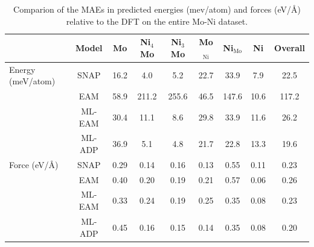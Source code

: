 \documentclass[prb,reprint]{revtex4-2}
\begin{document}
\begin{table}[h]
\centering
\begin{tabular}{lcccccccc}
\hline
                  & Model  & Mo   & Ni$_4$Mo & Ni$_3$Mo & Mo$_{\mathrm{Ni}}$ & Ni$_{\mathrm{Mo}}$ & Ni   & Overall \\
\hline
Energy (meV/atom) & SNAP   & 16.2 & 4.0      & 5.2      & 22.7               & 33.9               & 7.9  & 22.5    \\
                  & EAM    & 58.9 & 211.2    & 255.6    & 46.5               & 147.6              & 10.6 & 117.2   \\
                  & ML-EAM & 30.4 & 11.1     & 8.6      & 29.8               & 33.9               & 11.6 & 26.2    \\
                  & ML-ADP & 36.9 & 5.1      & 4.8      & 21.7               & 22.8               & 13.3 & 19.6    \\
\hline
Force (eV/\AA)    & SNAP   & 0.29 & 0.14     & 0.16     & 0.13               & 0.55               & 0.11 & 0.23    \\
                  & EAM    & 0.40 & 0.20     & 0.19     & 0.21               & 0.57               & 0.06 & 0.26    \\
                  & ML-EAM & 0.33 & 0.24     & 0.19     & 0.25               & 0.35               & 0.08 & 0.23    \\
                  & ML-ADP & 0.45 & 0.16     & 0.15     & 0.14               & 0.35               & 0.08 & 0.20    \\
\hline
\end{tabular}
\caption{\label{table:MAE}
Comparion of the MAEs in predicted energies (mev/atom) and forces (eV/\AA) 
relative to the DFT on the entire Mo-Ni dataset.}
\end{table}
\end{document}
